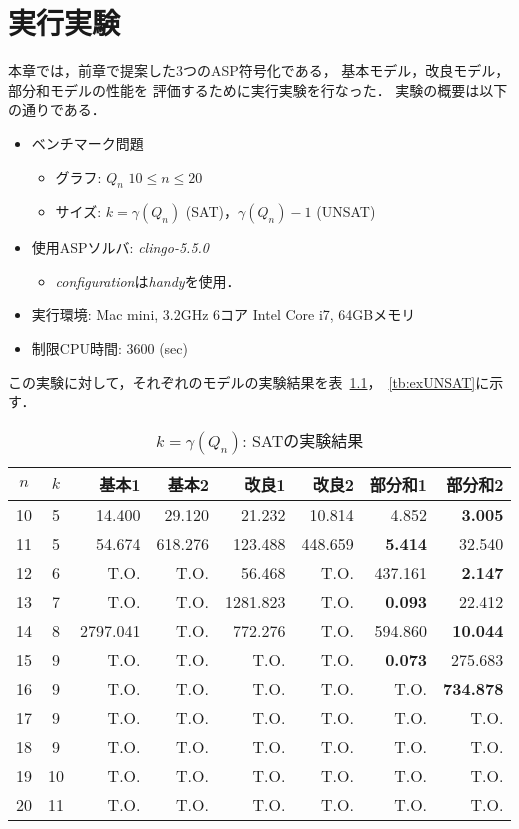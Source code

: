 \chapter{実行実験}\label{chap:experiment}
本章では，前章で提案した3つのASP符号化である，
基本モデル，改良モデル，部分和モデルの性能を
評価するために実行実験を行なった．
実験の概要は以下の通りである．
\begin{itemize}
 \item ベンチマーク問題
 \begin{itemize}
      \item グラフ: $Q_{n}$ $10 \le n \le 20$ 
      \item サイズ: $ k = \gamma(Q_n)$ (SAT)，$\gamma(Q_n)-1$ (UNSAT)%
 \end{itemize}
 \item 使用ASPソルバ: \textit{clingo-5.5.0}
       \begin{itemize}
	\item \textit{configuration}は\textit{handy}を使用．
       \end{itemize}
 \item 実行環境: Mac mini, 3.2GHz 6コア Intel Core i7, 64GBメモリ
 \item 制限CPU時間: 3600 (sec)
\end{itemize}

この実験に対して，それぞれのモデルの実験結果を表~\ref{tb:exSAT}，~\ref{tb:exUNSAT}に示す．
\begin{table}[ht]
 \caption{$k=\gamma(Q_n)$: SATの実験結果}
 \label{tb:exSAT}
 \centering
 \begin{tabular}{c|c|r|r|r|r|r|r} \hline
  $n$ & $k$ & 基本1 & 基本2 & 改良1 & 改良2 & 部分和1 & 部分和2 \\ \hline
  10 & 5 & 14.400 & 29.120 & 21.232 & 10.814 & 4.852 & \textbf{3.005} \\
  11 & 5 & 54.674 & 618.276 & 123.488 & 448.659 & \textbf{5.414} & 32.540 \\
  12 & 6 & T.O. & T.O. & 56.468 & T.O. & 437.161 & \textbf{2.147} \\
  13 & 7 & T.O. & T.O. & 1281.823 & T.O. & \textbf{0.093} & 22.412 \\
  14 & 8 & 2797.041 & T.O. & 772.276 & T.O. & 594.860 & \textbf{10.044}\\
  15 & 9 & T.O. & T.O. & T.O. & T.O. & \textbf{0.073} & 275.683 \\
  16 & 9 & T.O. & T.O. & T.O. & T.O. & T.O. & \textbf{734.878} \\
  17 & 9 & T.O. & T.O. & T.O. & T.O. & T.O. & T.O. \\
  18 & 9 & T.O. & T.O. & T.O. & T.O. & T.O. & T.O. \\
  19 & 10 & T.O. & T.O. & T.O. & T.O. & T.O. & T.O. \\
  20 & 11 & T.O. & T.O. & T.O. & T.O. & T.O. & T.O. \\ \hline
 \end{tabular}
\end{table}

